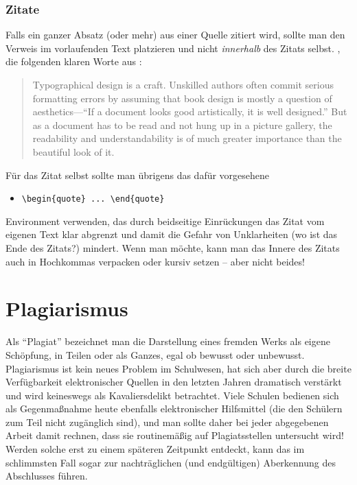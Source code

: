 \subsubsection{Zitate}
Falls ein ganzer Absatz (oder mehr) aus einer Quelle zitiert wird,
sollte man den Verweis im vorlaufenden Text platzieren und nicht
\emph{innerhalb} des Zitats selbst. \ZB, die folgenden klaren Worte
aus \cite{Oetiker01}:
\begin{quote}
Typographical design is a craft. Unskilled authors often commit
serious formatting errors by assuming that book design is mostly a
question of aesthetics---``If a document looks good artistically,
it is well designed.'' But as a document has to be read and not
hung up in a picture gallery, the readability and
understandability is of much greater importance than the beautiful
look of it.
\end{quote}
Für das Zitat selbst sollte man übrigens das dafür vorgesehene
%
\begin{itemize}
 \item[] \verb!\begin{quote} ... \end{quote}!
\end{itemize}
%
Environment verwenden, das durch beidseitige Einrückungen das
Zitat vom eigenen Text klar abgrenzt und damit die Gefahr von
Unklarheiten (wo ist das Ende des Zitats?) mindert.
Wenn man möchte, kann man das Innere des Zitats auch in Hochkommas verpacken oder kursiv setzen -- aber nicht beides!


\section{Plagiarismus}

Als "`Plagiat"' bezeichnet man die Darstellung eines fremden Werks als eigene Schöpfung, 
in Teilen oder als Ganzes, egal ob bewusst oder unbewusst.
Plagiarismus ist kein neues Problem im Schulwesen, hat sich aber durch die 
breite Verfügbarkeit elektronischer Quellen in den letzten Jahren dramatisch 
verstärkt und wird keineswegs als Kavaliersdelikt betrachtet.
Viele Schulen bedienen sich als Gegenmaßnahme heute ebenfalls elektronischer Hilfsmittel 
(die den Schülern zum Teil nicht zugänglich sind), und man sollte daher bei
jeder abgegebenen Arbeit damit rechnen, dass sie routinemäßig auf Plagiatsstellen untersucht wird!
Werden solche erst zu einem späteren Zeitpunkt entdeckt, kann das im schlimmsten Fall sogar 
zur nachträglichen (und endgültigen) Aberkennung des Abschlusses führen.

